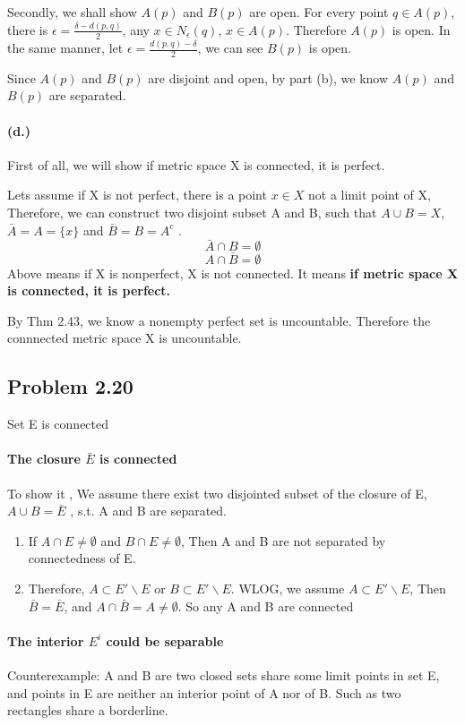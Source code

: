 \documentclass{article}
\begin{document}
Secondly, we shall show $A(p)$ and $B(p)$ are open.
For every point $ q \in A(p) $,  there is $\epsilon = \frac{\delta - d(p,q)}{2}$, any $x \in N_{\epsilon}(q)$, $ x \in  A(p)$.
Therefore $A(p)$ is open.
In the same manner, let $\epsilon = \frac{d(p,q) - \delta }{2}$, we can see $B(p)$ is open.

Since $A(p)$ and $B(p)$ are disjoint and open, by part (b), we know $A(p)$ and $B(p)$ are separated.

\paragraph{(d.)}
First of all, we will show if metric space X  is connected, it is perfect.

Lets assume if X is not perfect, there is a point $x \in X$ not a limit point of X,
Therefore,  we can construct two disjoint subset A and B, such that $ A \cup B = X$, $ \bar{A} = A = \{x\}$ and $ \bar{B} = B = A^c$ .
$$ \bar{A} \cap B = \emptyset $$
$$ A \cap \bar{B} = \emptyset $$
Above means if X is nonperfect, X is not connected. It means \textbf{if metric space X  is connected, it is perfect.}

By Thm 2.43, we know a nonempty perfect set is uncountable. Therefore the connnected metric space X is uncountable.

\subsection*{Problem 2.20}
Set E is connected
\paragraph{ The closure $ \bar{E} $ is connected}
To show it , We assume there exist two disjointed subset of the closure of E, $A \cup B = \bar{E}$  , s.t. A and B are separated.

\begin{enumerate}
  \item If $A \cap E \neq \emptyset$ and $B \cap E \neq \emptyset$, Then A and B are not separated by connectedness of E.
  \item Therefore, $ A \subset E' \backslash E $ or $B \subset E'\backslash  E $. WLOG, we assume $ A \subset E' \backslash E $, Then $ \bar{B} = \bar{E}$, and $ A \cap \bar{B} = A \neq \emptyset$. So any A and B are connected
\end{enumerate}

\paragraph{ The interior $E^i$ could be separable}
Counterexample: A and B are two closed sets share some limit points in set E, and points in E are neither an interior point of A nor of B.
Such as two rectangles share a borderline.
\end{document}

